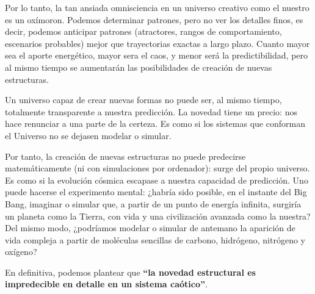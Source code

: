 \documentclass[
  11pt,
  a4paper,
  DIV=11,
  numbers=noendperiod]{scrreprt}
\begin{document}
Por lo tanto, la tan ansiada omnisciencia en un universo creativo como
el nuestro es un oxímoron. Podemos determinar patrones, pero no ver los
detalles finos, es decir, podemos anticipar patrones (atractores, rangos
de comportamiento, escenarios probables) mejor que trayectorias exactas
a largo plazo. Cuanto mayor sea el aporte energético, mayor sera el
caos, y menor será la predictibilidad, pero al mismo tiempo se
aumentarán las posibilidades de creación de nuevas estructuras.

Un universo capaz de crear nuevas formas no puede ser, al mismo tiempo,
totalmente transparente a nuestra predicción. La novedad tiene un
precio: nos hace renunciar a una parte de la certeza. Es como si los
sistemas que conforman el Universo no se dejasen modelar o simular.

Por tanto, la creación de nuevas estructuras no puede predecirse
matemáticamente (ni con simulaciones por ordenador): surge del propio
universo. Es como si la evolución cósmica escapase a nuestra capacidad
de predicción. Uno puede hacerse el experimento mental: ¿habría sido
posible, en el instante del Big Bang, imaginar o simular que, a partir
de un punto de energía infinita, surgiría un planeta como la Tierra, con
vida y una civilización avanzada como la nuestra? Del mismo modo,
¿podríamos modelar o simular de antemano la aparición de vida compleja a
partir de moléculas sencillas de carbono, hidrógeno, nitrógeno y
oxígeno?

En definitiva, podemos plantear que \textbf{``la novedad estructural es
impredecible en detalle en un sistema caótico''}.
\end{document}
